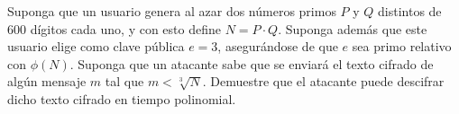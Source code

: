 Suponga que un usuario genera al azar dos números primos $P$ y $Q$ distintos de 600 dígitos cada uno, y con esto define $N = P \cdot Q$. Suponga además que este usuario elige como clave pública $e = 3$, asegurándose de que $e$ sea primo relativo con $\phi(N)$. Suponga que un atacante sabe que se enviará el texto cifrado de algún mensaje $m$ tal que $m < \sqrt[3]{N}$. Demuestre que el atacante puede descifrar dicho texto cifrado en tiempo polinomial.
